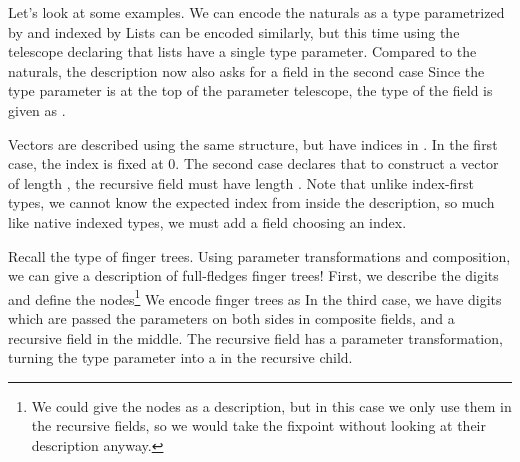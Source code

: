 
Let's look at some examples. We can encode the naturals as a type parametrized by  and indexed by 
Lists can be encoded similarly, but this time using the telescope
declaring that lists have a single type parameter. Compared to the naturals, the description now also asks for a field in the second case
Since the type parameter is at the top of the parameter telescope, the type of the field is given as .

Vectors are described using the same structure, but have indices in \bN{}.
In the first case, the index is fixed at 0. The second case declares that to construct a vector of length , the recursive field must have length . Note that unlike index-first types, we cannot know the expected index from inside the description, so much like native indexed types, we must add a field choosing an index.

Recall the type of finger trees. Using parameter transformations and composition, we can give a description of full-fledges finger trees! First, we describe the digits
and define the nodes\footnote{We could give the nodes as a description, but in this case we only use them in the recursive fields, so we would take the fixpoint without looking at their description anyway.}
We encode finger trees as
In the third case, we have digits which are passed the parameters on both sides in composite fields, and a recursive field in the middle. The recursive field has a parameter transformation, turning the type parameter  into a  in the recursive child.





